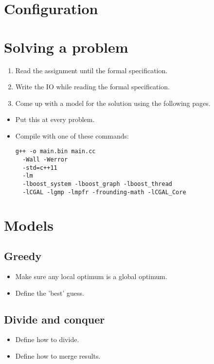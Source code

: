 \documentclass[guide.tex]{subfiles}
\begin{document}
\section{Configuration}



\section{Solving a problem}

{\Huge

\begin{enumerate}
  \item Read the assignment until the formal specification.
  \item Write the IO while reading the formal specification.
  \item Come up with a model for the solution using the following pages.
\end{enumerate}

}

\begin{itemize}
\item Put this at every problem.
  \newline {}
\item Compile with one of these commands:
  \newline {}
  \begin{verbatim}
g++ -o main.bin main.cc
  -Wall -Werror
  -std=c++11
  -lm
  -lboost_system -lboost_graph -lboost_thread
  -lCGAL -lgmp -lmpfr -frounding-math -lCGAL_Core
  \end{verbatim}
\end{itemize}
\pagebreak

\section{Models}

\subsection{Greedy}
\begin{itemize}
  \item Make sure any local optimum is a global optimum.
  \item Define the 'best' guess.
\end{itemize}

\subsection{Divide and conquer}
\begin{itemize}
  \item Define how to divide.
  \item Define how to merge results.
\end{itemize}
\end{document}
